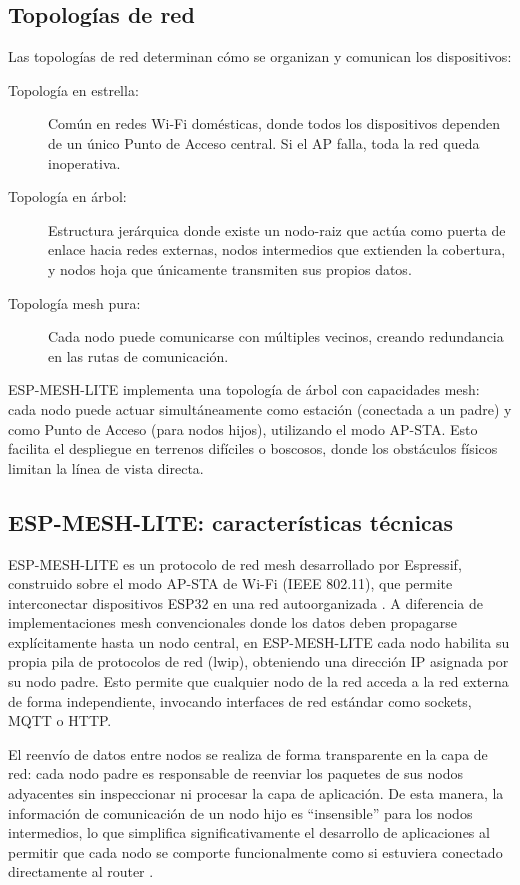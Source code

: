 \documentclass[a4paper, 12pt]{report}
\begin{document}
\subsection{Topologías de red}

Las topologías de red determinan cómo se organizan y comunican los dispositivos:

\begin{description}
  \item[Topología en estrella:] Común en redes Wi-Fi domésticas, donde todos
    los dispositivos dependen de un único Punto de Acceso central. Si el
    AP falla, toda la red queda inoperativa.
  \item[Topología en árbol:] Estructura jerárquica donde existe un
    \gls{nodo-raiz} que actúa como puerta de enlace hacia redes externas,
    nodos intermedios que extienden la cobertura, y nodos hoja que
    únicamente transmiten sus propios datos.
  \item[Topología mesh pura:] Cada nodo puede comunicarse con múltiples
    vecinos, creando redundancia en las rutas de comunicación.
\end{description}

\gls{ESP-MESH-LITE} implementa una topología de árbol con capacidades mesh: cada
\gls{nodo} puede actuar simultáneamente como estación (conectada a un padre)
y como Punto de Acceso (para nodos hijos), utilizando el modo \gls{AP-STA}.
Esto facilita el despliegue en terrenos difíciles o boscosos, donde los
obstáculos físicos limitan la línea de vista directa.

\subsection{ESP-MESH-LITE: características técnicas}

\gls{ESP-MESH-LITE} es un protocolo de red mesh desarrollado por Espressif,
construido sobre el modo \gls{AP-STA} de Wi-Fi (IEEE 802.11), que permite
interconectar dispositivos \gls{ESP32} en una red autoorganizada
\cite{espmesh2023}. A diferencia de implementaciones mesh convencionales donde
los datos deben propagarse explícitamente hasta un nodo central, en
\gls{ESP-MESH-LITE} cada nodo habilita su propia pila de protocolos de red
(\gls{lwip}), obteniendo una dirección IP asignada por su nodo padre. Esto
permite que cualquier nodo de la red acceda a la red externa de forma
independiente, invocando interfaces de red estándar como sockets, MQTT o HTTP.

El reenvío de datos entre nodos se realiza de forma transparente en la capa de
red: cada nodo padre es responsable de reenviar los paquetes de sus nodos
adyacentes sin inspeccionar ni procesar la capa de aplicación. De esta manera,
la información de comunicación de un nodo hijo es ``insensible'' para los nodos
intermedios, lo que simplifica significativamente el desarrollo de aplicaciones
al permitir que cada nodo se comporte funcionalmente como si estuviera conectado
directamente al router \cite{espmesh2023}.
\end{document}
